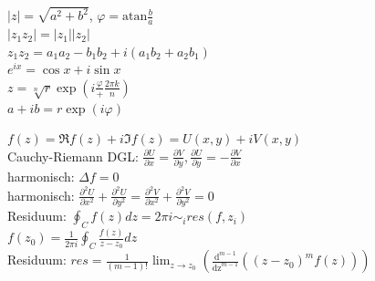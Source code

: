 \documentclass[12pt,a4paper, twoside]{article}
\newcommand{\abs}[1]{\left| #1 \right|}
\newcommand{\pd}[2]{\frac{\partial #1}{\partial #2}}
\newcommand{\pdd}[2]{\frac{\partial^2 #1}{\partial #2^2}}
\renewcommand{\=}[1]{\stackrel{#1}{=}}
\theoremstyle{definition}
\theoremstyle{remark}
\begin{document}
\begin{center}
\begin{minipage}[t]{.39\linewidth}
\vspace{0pt}

$\abs{z} = \sqrt{a^2 + b^2}$, $\varphi = \text{atan} \frac{b}{a}$\\
$\abs{z_1 z_2} = \abs{z_1} \abs{z_2}$\\
$z_1 z_2 = a_1 a_2 - b_1 b_2 + i(a_1 b_2 + a_2 b_1)$\\
$e^{ix} = \cos x + i \sin x$\\
$z = \sqrt[n]{r} \exp(i \frac{\varphi} + \frac{2\pi k}{n})$\\
$a + ib = r \exp(i \varphi)$\\
\end{minipage}%
\begin{minipage}[t]{.59\linewidth}
\vspace{0pt}

$f(z) = \Re f(z) + i \Im f(z) = U(x,y) + i V(x,y)$\\
Cauchy-Riemann DGL: $\pd{U}{x} = \pd{V}{y}, \pd{U}{y} = - \pd{V}{x}$\\
harmonisch: $\Delta f = 0$\\
harmonisch: $\pdd{U}{x} + \pdd{U}{y} = \pdd{V}{x} + \pdd{V}{y} = 0$\\
Residuum: $\oint_C f(z) dz = 2\pi i \sim_i res(f, z_i)$\\
$f(z_0) = \frac{1}{2\pi i} \oint_C \frac{f(z)}{z-z_0}dz$\\
Residuum: $res = \frac{1}{(m-1)!} \lim_{z \rightarrow z_0} (\frac{\text{d}^{m-1}}{\text{dz}^{m-1}}((z-z_0)^m f(z)))$\\

\end{minipage}
\end{center}
\end{document}
